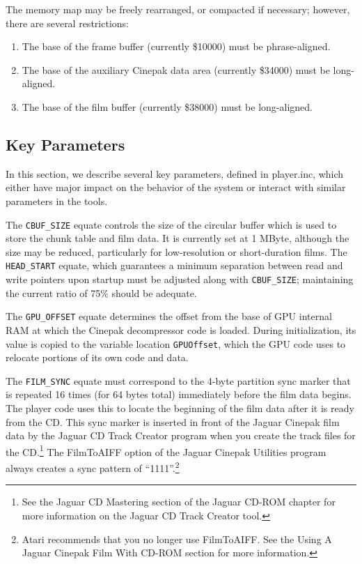 \documentclass[12pt,letterpaper,twoside]{article}
\begin{document}
The memory map may be freely rearranged, or compacted if necessary; however, there are several restrictions:
\begin{enumerate}[left=0pt .. 36pt]
\item The base of the frame buffer (currently \$10000) must be phrase-aligned.
\item The base of the auxiliary Cinepak data area (currently \$34000) must be long-aligned.
\item The base of the film buffer (currently \$38000) must be long-aligned.
\end{enumerate}

\subsection{Key Parameters}
In this section, we describe several key parameters, defined in player.inc, which either have major impact on the behavior of the system or interact with similar parameters in the tools.

The \texttt{CBUF\_SIZE} equate controls the size of the circular buffer which is used to store the chunk table and film data. It is currently set at 1 MByte, although the size may be reduced, particularly for low-resolution or short-duration films. The \texttt{HEAD\_START} equate, which guarantees a minimum separation between read and write pointers upon startup must be adjusted along with \texttt{CBUF\_SIZE}; maintaining the current ratio of 75\% should be adequate.

The \texttt{GPU\_OFFSET} equate determines the offset from the base of GPU internal RAM at which the Cinepak decompressor code is loaded. During initialization, its value is copied to the variable location \texttt{GPUOffset}, which the GPU code uses to relocate portions of its own code and data.

The \texttt{FILM\_SYNC} equate must correspond to the 4-byte partition sync marker that is repeated 16 times (for 64 bytes total) immediately before the film data begins. The player code uses this to locate the beginning of the film data after it is ready from the CD. This sync marker is inserted in front of the Jaguar Cinepak film data by the Jaguar CD Track Creator program when you create the track files for the CD.\footnote{See the Jaguar CD Mastering section of the Jaguar CD-ROM chapter for more information on the Jaguar CD Track Creator tool.} The FilmToAIFF option of the Jaguar Cinepak Utilities program always creates a sync pattern of ``1111''.\footnote{Atari recommends that you no longer use FilmToAIFF. See the Using A Jaguar Cinepak Film With CD-ROM section for more information.}
\end{document}
